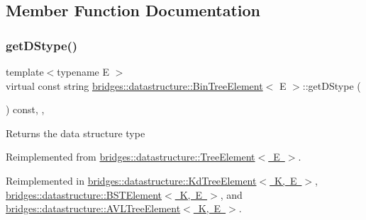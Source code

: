 \subsection{Member Function Documentation}
\mbox{\label{classbridges_1_1datastructure_1_1_bin_tree_element_aef86e3663785972251547e409fdc757b}} 
\subsubsection{\texorpdfstring{getDStype()}{getDStype()}}
{\footnotesize\ttfamily template$<$typename E $>$ \\
virtual const string \mbox{\hyperlink{classbridges_1_1datastructure_1_1_bin_tree_element}{bridges\+::datastructure\+::\+Bin\+Tree\+Element}}$<$ E $>$\+::get\+D\+Stype (\begin{DoxyParamCaption}{ }\end{DoxyParamCaption}) const\hspace{0.3cm}{\ttfamily [inline]}, {\ttfamily [override]}, {\ttfamily [virtual]}}

\begin{DoxyReturn}{Returns}
the data structure type 
\end{DoxyReturn}


Reimplemented from \mbox{\hyperlink{classbridges_1_1datastructure_1_1_tree_element_a897f34ea284da45e1dc869c3e3b6c9a4}{bridges\+::datastructure\+::\+Tree\+Element$<$ E $>$}}.



Reimplemented in \mbox{\hyperlink{classbridges_1_1datastructure_1_1_kd_tree_element_a76f6d9bfadfdec09d0a8564aa0e33235}{bridges\+::datastructure\+::\+Kd\+Tree\+Element$<$ K, E $>$}}, \mbox{\hyperlink{classbridges_1_1datastructure_1_1_b_s_t_element_a2bb8cc9ec4b6bc5b89ecef0f17be366f}{bridges\+::datastructure\+::\+B\+S\+T\+Element$<$ K, E $>$}}, and \mbox{\hyperlink{classbridges_1_1datastructure_1_1_a_v_l_tree_element_ab04d1e9ad4630e408041e8137dc9854a}{bridges\+::datastructure\+::\+A\+V\+L\+Tree\+Element$<$ K, E $>$}}.

\mbox{\label{classbridges_1_1datastructure_1_1_bin_tree_element_ab30cfe373892c52709d5f1df013a0c82}} 
